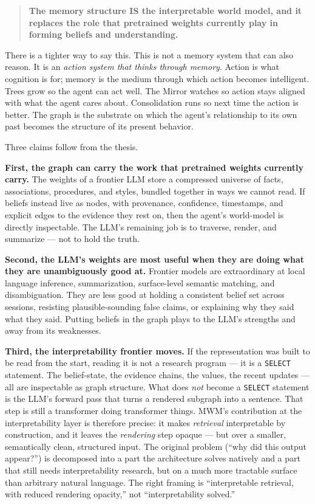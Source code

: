 \documentclass[12pt]{article}
\begin{document}
\begin{quote}
\textbf{The memory structure IS the interpretable world model, and it replaces the role that pretrained weights currently play in forming beliefs and understanding.}
\end{quote}

There is a tighter way to say this. This is not a memory system that can also reason. It is an \emph{action system that thinks through memory}. Action is what cognition is for; memory is the medium through which action becomes intelligent. Trees grow so the agent can act well. The Mirror watches so action stays aligned with what the agent cares about. Consolidation runs so next time the action is better. The graph is the substrate on which the agent's relationship to its own past becomes the structure of its present behavior.

Three claims follow from the thesis.

\textbf{First, the graph can carry the work that pretrained weights currently carry.} The weights of a frontier LLM store a compressed universe of facts, associations, procedures, and styles, bundled together in ways we cannot read. If beliefs instead live as nodes, with provenance, confidence, timestamps, and explicit edges to the evidence they rest on, then the agent's world-model is directly inspectable. The LLM's remaining job is to traverse, render, and summarize --- not to hold the truth.

\textbf{Second, the LLM's weights are most useful when they are doing what they are unambiguously good at.} Frontier models are extraordinary at local language inference, summarization, surface-level semantic matching, and disambiguation. They are less good at holding a consistent belief set across sessions, resisting plausible-sounding false claims, or explaining why they said what they said. Putting beliefs in the graph plays to the LLM's strengths and away from its weaknesses.

\textbf{Third, the interpretability frontier moves.} If the representation was built to be read from the start, reading it is not a research program --- it is a \texttt{SELECT} statement. The belief-state, the evidence chains, the values, the recent updates --- all are inspectable as graph structure. What does \emph{not} become a \texttt{SELECT} statement is the LLM's forward pass that turns a rendered subgraph into a sentence. That step is still a transformer doing transformer things. MWM's contribution at the interpretability layer is therefore precise: it makes \emph{retrieval} interpretable by construction, and it leaves the \emph{rendering} step opaque --- but over a smaller, semantically clean, structured input. The original problem (``why did this output appear?'') is decomposed into a part the architecture solves natively and a part that still needs interpretability research, but on a much more tractable surface than arbitrary natural language. The right framing is ``interpretable retrieval, with reduced rendering opacity,'' not ``interpretability solved.''
\end{document}
